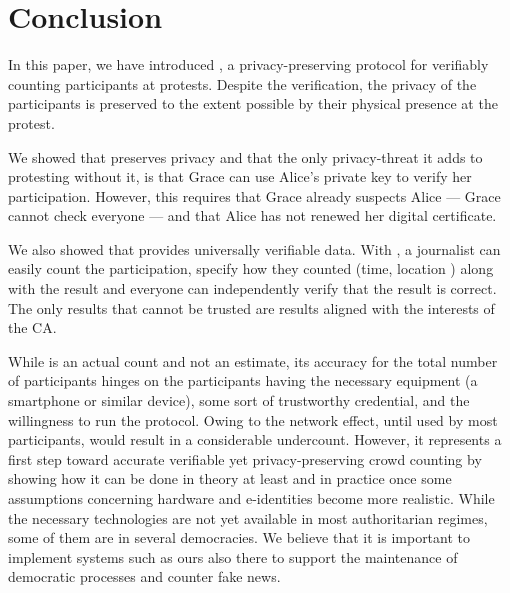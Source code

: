 \section{Conclusion}%
\label{Conclusion}

In this paper, we have introduced \CROCUS, a privacy-preserving protocol for 
verifiably counting participants at protests.
Despite the verification, the privacy of the participants is preserved to the 
extent possible by their physical presence at the protest.

We showed that \CROCUS preserves privacy and that the only privacy-threat it 
adds to protesting without it, is that Grace can use Alice's private key to 
verify her participation.
However, this requires that Grace already suspects Alice --- Grace cannot check 
everyone --- and that Alice has not renewed her digital certificate.

We also showed that \CROCUS provides universally verifiable data.
With \CROCUS, a journalist can easily count the participation, specify how they 
counted (time, location \etc) along with the result and everyone can 
independently verify that the result is correct.
The only results that cannot be trusted are results aligned with the interests 
of the \ac{CA}.


While \CROCUS is an actual count and not an estimate, its accuracy for the 
total number of participants hinges on the participants having the necessary 
equipment (\ie a smartphone or similar device), some sort of trustworthy 
credential, and the willingness to run the protocol. Owing to the network 
effect, until used by most participants, \CROCUS would result in a considerable 
undercount. However, it represents a first step toward accurate verifiable yet 
privacy-preserving crowd counting by showing how it can be done in theory at 
least and in practice once some assumptions concerning hardware and 
e-identities become more realistic. While the necessary technologies are not 
yet available in most authoritarian regimes, some of them are in several 
democracies. We believe that it is important to implement systems such as ours 
also there to support the maintenance of democratic processes and counter fake 
news.  

